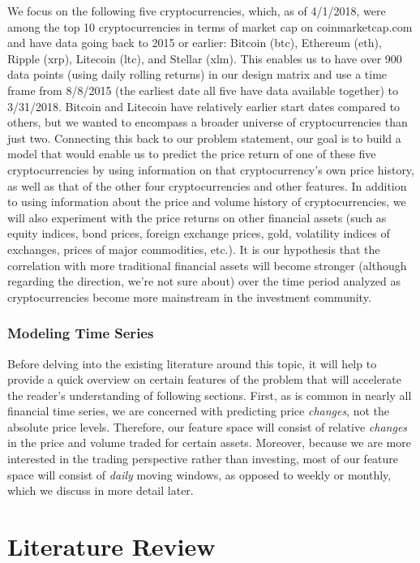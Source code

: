 \documentclass[12pt,twoside]{article}
\begin{document}
We focus on the following five cryptocurrencies, which, as of 4/1/2018, were among the top 10 cryptocurrencies in terms of market cap on coinmarketcap.com and have data going back to 2015 or earlier: Bitcoin (btc), Ethereum (eth), Ripple (xrp), Litecoin (ltc), and Stellar (xlm). This enables us to have over 900 data points (using daily rolling returns) in our design matrix and use a time frame from 8/8/2015 (the earliest date all five have data available together) to 3/31/2018. Bitcoin and Litecoin have relatively earlier start dates compared to others, but we wanted to encompass a broader universe of cryptocurrencies than just two. Connecting this back to our problem statement, our goal is to build a model that would enable us to predict the price return of one of these five cryptocurrencies by using information on that cryptocurrency's own price history, as well as that of the other four cryptocurrencies and other features.
\bigbreak
In addition to using information about the price and volume history of cryptocurrencies, we will also experiment with the price returns on other financial assets (such as equity indices, bond prices, foreign exchange prices, gold, volatility indices of exchanges, prices of major commodities, etc.). It is our hypothesis that the correlation with more traditional financial assets will become stronger (although regarding the direction, we’re not sure about) over the time period analyzed as cryptocurrencies become more mainstream in the investment community.
\subsubsection{Modeling Time Series}
Before delving into the existing literature around this topic, it will help to provide a quick overview on certain features of the problem that will accelerate the reader's understanding of following sections. First, as is common in nearly all financial time series, we are concerned with predicting price \textit{changes}, not the absolute price levels. Therefore, our feature space will consist of relative \textit{changes} in the price and volume traded for certain assets. Moreover, because we are more interested in the trading perspective rather than investing, most of our feature space will consist of \textit{daily} moving windows, as opposed to weekly or monthly, which we discuss in more detail later.
\section{Literature Review}
\end{document}
